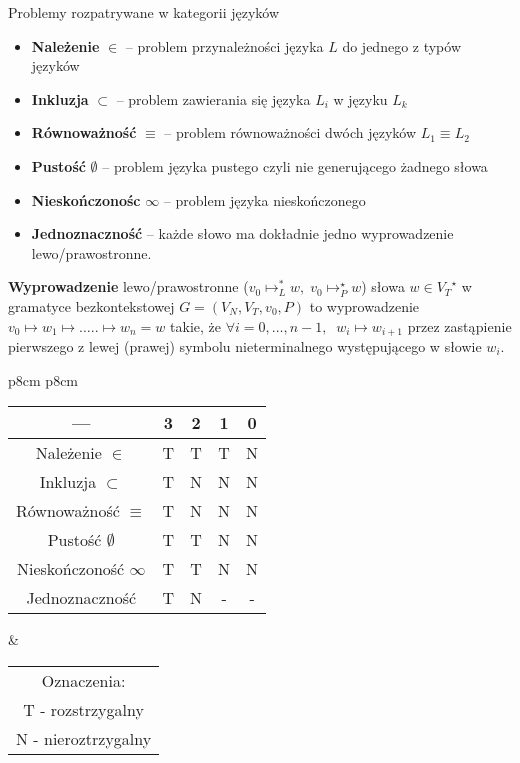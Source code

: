 \documentclass[main.tex]{subfiles}
\begin{document}
    Problemy rozpatrywane w kategorii języków
    \begin{itemize}[noitemsep]
        \item \textbf{Należenie} $\in$ -- problem przynależności języka $L$ do jednego z typów języków
        \item \textbf{Inkluzja} $\subset$ -- problem zawierania się języka $L_i$ w języku $L_k$
        \item \textbf{Równoważność} $\equiv$ -- problem równoważności dwóch języków $L_1 \equiv L_2$
        \item \textbf{Pustość} $\emptyset$ -- problem języka pustego czyli nie generującego żadnego słowa
        \item \textbf{Nieskończonośc} $\infty$ -- problem języka nieskończonego
        \item \textbf{Jednoznaczność} -- każde słowo ma dokładnie jedno wyprowadzenie lewo/prawostronne.
    \end{itemize}

    \begin{definition}
        \textbf{Wyprowadzenie} lewo/prawostronne ($v_{0}\mapsto_{L}^{*}w,\; v_{0}\mapsto_{P}^{\star}w$)
        słowa $w \in {V_T}^\star$ w gramatyce
        bezkontekstowej $G = (V_N,V_T,v_0,P)$ to wyprowadzenie $v_0 \mapsto w_1 \mapsto \ldots.. \mapsto w_n = w$
        takie, że $\forall i=0,\ldots,n-1, \;\; w_i \mapsto w_{i+1}$ przez zastąpienie
        pierwszego z lewej (prawej) symbolu nieterminalnego występującego w słowie $w_i$.
    \end{definition}

    \begin{center}
        \begin{tabular}{p{8cm} p{8cm}}
            \begin{tabular}{c | c c c c}
                --- & 3 & 2 & 1 & 0 \\ [0.5ex]
                \hline
                Należenie $\in$ & T & T & T & N \\
                \hline
                Inkluzja $\subset$ & T & N & N & N \\
                \hline
                Równoważność $\equiv$ & T & N & N & N \\
                \hline
                Pustość $\emptyset$ & T & T & N & N \\
                \hline
                Nieskończoność $\infty$ & T & T & N & N \\
                \hline
                Jednoznaczność & T & N & - & - \\ [1ex]
            \end{tabular}
            &
            \begin{tabular}{c}
                Oznaczenia:\\
                T - rozstrzygalny\\
                N - nieroztrzygalny
            \end{tabular}
        \end{tabular}
    \end{center}
\end{document}
